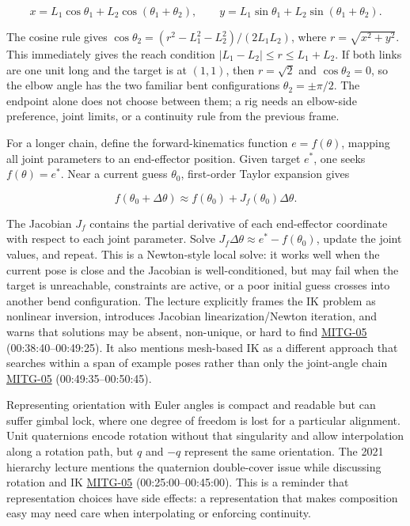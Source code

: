 \[
x=L_1\cos\theta_1+L_2\cos(\theta_1+\theta_2),\qquad
y=L_1\sin\theta_1+L_2\sin(\theta_1+\theta_2).
\]

The cosine rule gives \(\cos\theta_2=(r^2-L_1^2-L_2^2)/(2L_1L_2)\), where \(r=\sqrt{x^2+y^2}\). This immediately gives the reach condition \(|L_1-L_2|\le r\le L_1+L_2\). If both links are one unit long and the target is at \((1,1)\), then \(r=\sqrt2\) and \(\cos\theta_2=0\), so the elbow angle has the two familiar bent configurations \(\theta_2=\pm\pi/2\). The endpoint alone does not choose between them; a rig needs an elbow-side preference, joint limits, or a continuity rule from the previous frame.

For a longer chain, define the forward-kinematics function \(e=f(\theta)\), mapping all joint parameters to an end-effector position. Given target \(e^*\), one seeks \(f(\theta)=e^*\). Near a current guess \(\theta_0\), first-order Taylor expansion gives

\[
f(\theta_0+\Delta\theta)\approx f(\theta_0)+J_f(\theta_0)\Delta\theta.
\]

The Jacobian \(J_f\) contains the partial derivative of each end-effector coordinate with respect to each joint parameter. Solve \(J_f\Delta\theta\approx e^*-f(\theta_0)\), update the joint values, and repeat. This is a Newton-style local solve: it works well when the current pose is close and the Jacobian is well-conditioned, but may fail when the target is unreachable, constraints are active, or a poor initial guess crosses into another bend configuration. The lecture explicitly frames the IK problem as nonlinear inversion, introduces Jacobian linearization/Newton iteration, and warns that solutions may be absent, non-unique, or hard to find \hyperref[04-visual-computing-ii-ch036]{MITG-05} (00:38:40--00:49:25). It also mentions mesh-based IK as a different approach that searches within a span of example poses rather than only the joint-angle chain \hyperref[04-visual-computing-ii-ch036]{MITG-05} (00:49:35--00:50:45).

Representing orientation with Euler angles is compact and readable but can suffer gimbal lock, where one degree of freedom is lost for a particular alignment. Unit quaternions encode rotation without that singularity and allow interpolation along a rotation path, but \(q\) and \(-q\) represent the same orientation. The 2021 hierarchy lecture mentions the quaternion double-cover issue while discussing rotation and IK \hyperref[04-visual-computing-ii-ch036]{MITG-05} (00:25:00--00:45:00). This is a reminder that representation choices have side effects: a representation that makes composition easy may need care when interpolating or enforcing continuity.

